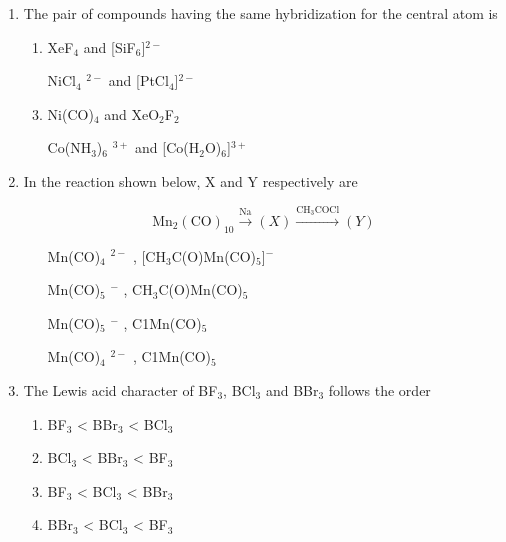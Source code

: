 \documentclass[journal,12pt,onecolumn]{IEEEtran}
\theoremstyle{remark}
\begin{document}
\begin{enumerate}
\item The pair of compounds having the same hybridization for the central atom is  \hfill{}

\begin{center}
    

\begin{multicols}{2}
\begin{enumerate}[label=(\Alph*)]
 \item   XeF$_4$ and [SiF$_6$]$^{2-}$  
 \item   [NiCl$_4$]$^{2-}$ and [PtCl$_4$]$^{2-}$  
 \item   Ni(CO)$_4$ and XeO$_2$F$_2$  
 \item   [Co(NH$_3$)$_6$]$^{3+}$ and [Co(H$_2$O)$_6$]$^{3+}$  
\end{enumerate}
\end{multicols}

\end{center}


\item In the reaction shown below, X and Y respectively are  \hfill{}

\[
\text{Mn}_2(\text{CO})_{10} \xrightarrow{\text{Na}} (X) \xrightarrow{\text{CH}_3\text{COCl}} (Y)
\]

\begin{multicols}{2}
\begin{enumerate}[label=(\Alph*)]
 \item   [Mn(CO)$_4$]$^{2-}$ , [CH$_3$C(O)Mn(CO)$_5$]$^{-}$  
 \item   [Mn(CO)$_5$]$^{-}$ , CH$_3$C(O)Mn(CO)$_5$  
 \item   [Mn(CO)$_5$]$^{-}$ , C1Mn(CO)$_5$  
 \item   [Mn(CO)$_4$]$^{2-}$ , C1Mn(CO)$_5$  
\end{enumerate}
\end{multicols}
  

\item The Lewis acid character of BF$_3$, BCl$_3$ and BBr$_3$ follows the order  \hfill{}

\begin{multicols}{2}
\begin{enumerate}[label=(\Alph*)]
\item BF$_3$ < BBr$_3$ < BCl$_3$  
\item BCl$_3$ < BBr$_3$ < BF$_3$  
\item BF$_3$ < BCl$_3$ < BBr$_3$  
\item BBr$_3$ < BCl$_3$ < BF$_3$  
\end{enumerate}
\end{multicols}
  


\end{enumerate}
\end{document}
